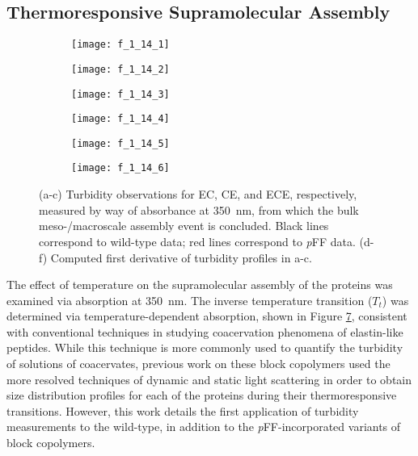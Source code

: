 \begin{refsection}
\subsection{Thermoresponsive Supramolecular Assembly}
\label{sec:lcst}
\begin{figure}[h!]
    \centering
    \begin{subfigure}[b]{0.32\textwidth}
        \texttt{[image: f\_1\_14\_1]}
        \caption{}
        \label{fig:LCST_ECpFF}
    \end{subfigure}
    \begin{subfigure}[b]{0.32\textwidth}
        \texttt{[image: f\_1\_14\_2]}
        \caption{}
        \label{fig:LCST_CEpFF}
    \end{subfigure}
    \begin{subfigure}[b]{0.32\textwidth}
        \texttt{[image: f\_1\_14\_3]}
        \caption{}
        \label{fig:LCST_ECEpFF}
    \end{subfigure}

    \begin{subfigure}[b]{0.32\textwidth}
        \texttt{[image: f\_1\_14\_4]}
        \caption{}
        \label{fig:LCST_deriv_ECpFF}
    \end{subfigure}
    \begin{subfigure}[b]{0.32\textwidth}
        \texttt{[image: f\_1\_14\_5]}
        \caption{}
        \label{fig:LCST_deriv_CEpFF}
    \end{subfigure}
    \begin{subfigure}[b]{0.32\textwidth}
        \texttt{[image: f\_1\_14\_6]}
        \caption{}
        \label{fig:LCST_deriv_ECEpFF}
    \end{subfigure}
    \caption{(a-c) Turbidity observations for EC, CE, and ECE, respectively,
        measured by way of absorbance at \SI{350}{\nm}, from which the bulk
        meso-/macroscale assembly event is concluded. Black lines
        correspond to wild-type data; red lines correspond to \emph{p}FF data. (d-f)
    Computed first derivative of turbidity profiles in a-c.}
    \label{fig:lcst}
\end{figure}
The effect of temperature on the supramolecular assembly of the proteins was
examined via absorption at \SI{350}{\nm}. The inverse temperature transition
(${T_t}$) was determined via temperature-dependent absorption, shown in Figure
\ref{fig:lcst}, consistent with conventional techniques in studying coacervation
phenomena of elastin-like peptides.\cite{Urry1985} While this technique is more
commonly used to quantify the turbidity of solutions of coacervates, previous
work on these block copolymers used the more resolved techniques of dynamic and
static light scattering in order to obtain size distribution profiles for each
of the proteins during their thermoresponsive transitions. However, this work
details the first application of turbidity measurements to the
wild-type, in addition to the \emph{p}FF-incorporated variants of block copolymers.


\end{refsection}
